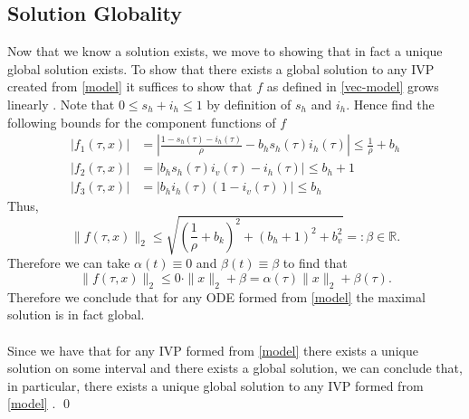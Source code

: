 \subsection{Solution Globality}
Now that we know a solution exists, we move to showing that in fact a unique global solution exists.
To show that there exists a global solution to any IVP created from \ref{model} it suffices to show that $f$ as defined in \ref{vec-model} grows linearly \cite{lecturenotes}.
Note that $0 \leq s_h + i_h \leq 1$ by definition of $s_h$ and $i_h$.
Hence find the following bounds for the component functions of $f$
\begin{align*}
    |f_1(\tau,x)| &= \left| \frac{1 - s_h(\tau) - i_h(\tau)}{\rho} - b_h s_h(\tau)i_h(\tau)\right|
                \leq \frac{1}{\rho} + b_h\\
    |f_2(\tau,x)| &= |b_h s_h(\tau) i_v(\tau) - i_h(\tau) |
                \leq b_h + 1\\
    |f_3(\tau,x)| &= |b_h i_h(\tau)(1 - i_v(\tau))| 
                \leq b_h
\end{align*}
Thus,
\begin{equation*}
    \| f(\tau,x) \|_2 \leq \sqrt{\left(\frac{1}{\rho} + b_k\right)^2 + (b_h+1)^2 + b_v^2} =:\beta \in \mathbb{R}.    
\end{equation*}
Therefore we can take $\alpha(t) \equiv 0$ and $\beta(t) \equiv \beta$ to find that
\begin{equation*}
    \| f(\tau,x) \|_2 \leq 0 \cdot \|x\|_2 + \beta = \alpha(\tau)\|x\|_2 + \beta(\tau).
\end{equation*}
Therefore we conclude that for any ODE formed from \ref{model} the maximal solution is in fact global.
\\\\
Since we have that for any IVP formed from \ref{model} there exists a unique solution on some interval and there exists a global solution, we can conclude that, in particular, there exists a unique global solution to any IVP formed from \ref{model} \cite{lecturenotes}. \qed
